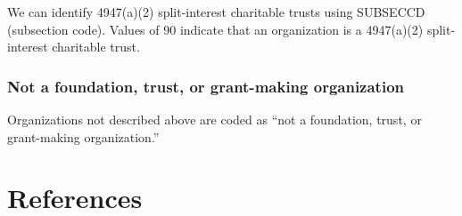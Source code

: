 \documentclass[
  letterpaper,
  DIV=11,
  numbers=noendperiod]{scrreprt}
\begin{document}
We can identify 4947(a)(2) split-interest charitable trusts using
SUBSECCD (subsection code). Values of 90 indicate that an organization
is a 4947(a)(2) split-interest charitable trust.

\hypertarget{not-a-foundation-trust-or-grant-making-organization}{%
\subsection{Not a foundation, trust, or grant-making
organization}\label{not-a-foundation-trust-or-grant-making-organization}}

Organizations not described above are coded as ``not a foundation,
trust, or grant-making organization.''


\hypertarget{references}{%
\chapter*{References}\label{references}}

\end{document}
